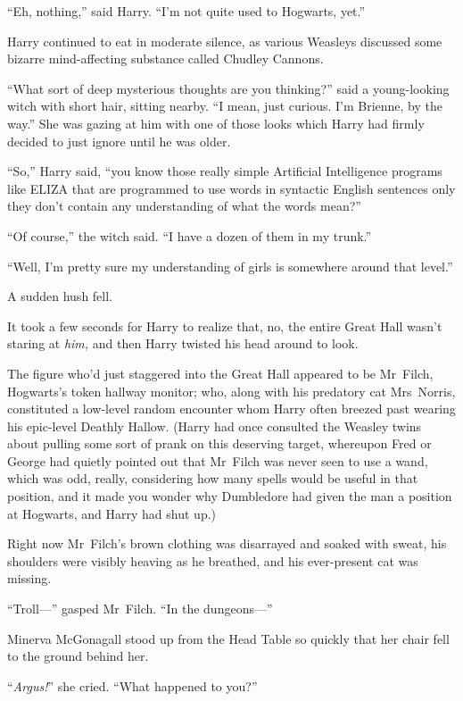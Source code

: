 “Eh, nothing,” said Harry. “I’m not quite used to Hogwarts, yet.”

Harry continued to eat in moderate silence, as various Weasleys discussed some bizarre mind-affecting substance called Chudley Cannons.

“What sort of deep mysterious thoughts are you thinking?” said a young-looking witch with short hair, sitting nearby. “I mean, just curious. I’m Brienne, by the way.” She was gazing at him with one of those looks which Harry had firmly decided to just ignore until he was older.

“So,” Harry said, “you know those really simple Artificial Intelligence programs like ELIZA that are programmed to use words in syntactic English sentences only they don’t contain any understanding of what the words mean?”

“Of course,” the witch said. “I have a dozen of them in my trunk.”

“Well, I’m pretty sure my understanding of girls is somewhere around that level.”

A sudden hush fell.

It took a few seconds for Harry to realize that, no, the entire Great Hall wasn’t staring at \emph{him,} and then Harry twisted his head around to look.

The figure who’d just staggered into the Great Hall appeared to be Mr~Filch, Hogwarts’s token hallway monitor; who, along with his predatory cat Mrs~Norris, constituted a low-level random encounter whom Harry often breezed past wearing his epic-level Deathly Hallow. (Harry had once consulted the Weasley twins about pulling some sort of prank on this deserving target, whereupon Fred or George had quietly pointed out that Mr~Filch was never seen to use a wand, which was odd, really, considering how many spells would be useful in that position, and it made you wonder why Dumbledore had given the man a position at Hogwarts, and Harry had shut up.)

Right now Mr~Filch’s brown clothing was disarrayed and soaked with sweat, his shoulders were visibly heaving as he breathed, and his ever-present cat was missing.

“Troll—” gasped Mr~Filch. “In the dungeons—”

\later

Minerva McGonagall stood up from the Head Table so quickly that her chair fell to the ground behind her.

“\emph{Argus!}” she cried. “What happened to you?”

